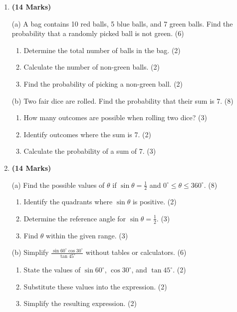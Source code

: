 \documentclass[12pt]{article}
\newenvironment{questionblock}[1][10]{
    \par\Needspace{#1\baselineskip}
}{
    \par
}
\begin{document}
\begin{enumerate}[start=3]
  \begin{questionblock}[15]
    \item \textbf{(14 Marks)}

    (a) A bag contains 10 red balls, 5 blue balls, and 7 green balls. Find the probability that a randomly picked ball is not green. (6)
    \begin{enumerate}[label=(\roman*)]
      \item Determine the total number of balls in the bag. (2)
      \item Calculate the number of non-green balls. (2)
      \item Find the probability of picking a non-green ball. (2)
    \end{enumerate}

    (b) Two fair dice are rolled. Find the probability that their sum is 7. (8)
    \begin{enumerate}[label=(\roman*)]
      \item How many outcomes are possible when rolling two dice? (3)
      \item Identify outcomes where the sum is 7. (2)
      \item Calculate the probability of a sum of 7. (3)
    \end{enumerate}
  \end{questionblock}

  \begin{questionblock}[15]
    \item \textbf{(14 Marks)}

    (a) Find the possible values of $\theta$ if $\sin \theta = \frac{1}{2}$ and $0^{\circ} \leq \theta \leq 360^{\circ}$. (8)
    \begin{enumerate}[label=(\roman*)]
      \item Identify the quadrants where $\sin \theta$ is positive. (2)
      \item Determine the reference angle for $\sin \theta = \frac{1}{2}$. (3)
      \item Find $\theta$ within the given range. (3)
    \end{enumerate}

    (b) Simplify $\frac{\sin 60^{\circ} \cos 30^{\circ}}{\tan 45^{\circ}}$ without tables or calculators. (6)
    \begin{enumerate}[label=(\roman*)]
      \item State the values of $\sin 60^{\circ}$, $\cos 30^{\circ}$, and $\tan 45^{\circ}$. (2)
      \item Substitute these values into the expression. (2)
      \item Simplify the resulting expression. (2)
    \end{enumerate}
  \end{questionblock}

\end{enumerate}
\end{document}
